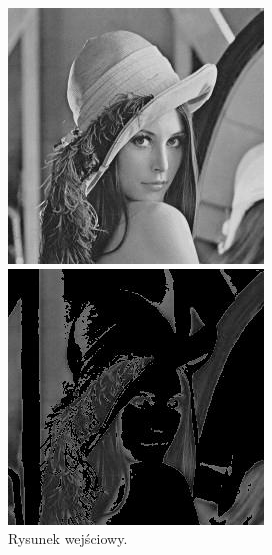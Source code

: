 \documentclass[10pt]{llncs}
\begin{document}
\begin{figure}[!htb]
  \includegraphics[width=\linewidth]{img/03.jpg}
  \caption{Rysunek wejściowy.}\label{fig:41}
\endminipage\hfill
{}
  \includegraphics[width=\linewidth]{img/03_region_01.jpg}

\end{figure}
\end{document}
